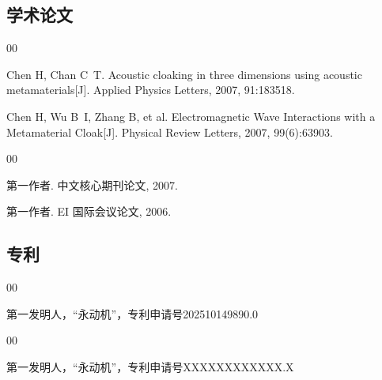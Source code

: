 \documentclass[type=master,math-style=TeX]{sjtuthesis}
\begin{document}
\begin{achievements}
  \subsection*{学术论文}
  \begin{bibliolist}{00}
    \item Chen H, Chan C~T. Acoustic cloaking in three dimensions using acoustic metamaterials[J]. Applied Physics Letters, 2007, 91:183518.
    \item Chen H, Wu B~I, Zhang B, et al. Electromagnetic Wave Interactions with a Metamaterial Cloak[J]. Physical Review Letters, 2007, 99(6):63903.
  \end{bibliolist}
  \begin{bibliolist*}{00}
    \item 第一作者. 中文核心期刊论文, 2007.
    \item 第一作者. EI 国际会议论文, 2006.
  \end{bibliolist*}

  \subsection*{专利}
  \begin{bibliolist}{00}
    \item 第一发明人，“永动机”，专利申请号202510149890.0
  \end{bibliolist}
  \begin{bibliolist*}{00}
    \item 第一发明人，“永动机”，专利申请号XXXXXXXXXXXX.X
  \end{bibliolist*}
\end{achievements}

\begin{digest}
\end{digest}

\end{document}
